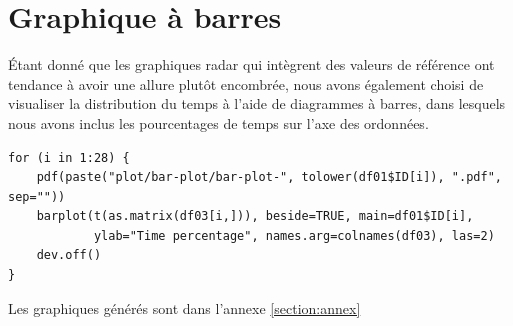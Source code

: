 \documentclass[11pt]{article}
\begin{document}
\newpage

\section{Graphique à barres}
Étant donné que les graphiques radar qui intègrent des valeurs de référence ont
tendance à avoir une allure plutôt encombrée, nous avons également choisi de
visualiser la distribution du temps à l'aide de diagrammes à barres, dans
lesquels nous avons inclus les pourcentages de temps sur l'axe des ordonnées.
\begin{verbatim}
for (i in 1:28) {
    pdf(paste("plot/bar-plot/bar-plot-", tolower(df01$ID[i]), ".pdf", sep=""))
    barplot(t(as.matrix(df03[i,])), beside=TRUE, main=df01$ID[i],
            ylab="Time percentage", names.arg=colnames(df03), las=2)
    dev.off()
}
\end{verbatim}
Les graphiques générés sont dans l'annexe \ref{section:annex}
\end{document}
